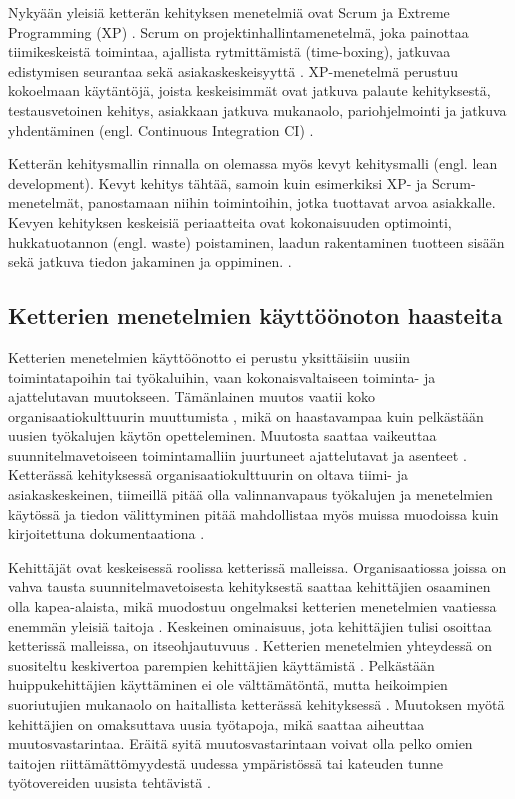 Nykyään yleisiä ketterän kehityksen menetelmiä ovat Scrum ja Extreme Programming
(XP) . Scrum on projektinhallintamenetelmä, joka painottaa
tiimikeskeistä toimintaa, ajallista rytmittämistä (time-boxing), jatkuvaa
edistymisen seurantaa sekä asiakaskeskeisyyttä .
XP-menetelmä perustuu kokoelmaan käytäntöjä, joista keskeisimmät ovat jatkuva
palaute kehityksestä, testausvetoinen kehitys, asiakkaan jatkuva mukanaolo,
pariohjelmointi ja jatkuva yhdentäminen (engl. Continuous Integration
CI) .

Ketterän kehitysmallin rinnalla on olemassa myös kevyt kehitysmalli (engl. lean
development). Kevyt kehitys tähtää, samoin kuin esimerkiksi XP- ja
Scrum-menetelmät, panostamaan niihin toimintoihin, jotka tuottavat arvoa
asiakkalle. Kevyen kehityksen keskeisiä periaatteita ovat kokonaisuuden
optimointi, hukkatuotannon (engl. waste) poistaminen, laadun rakentaminen
tuotteen sisään sekä jatkuva tiedon jakaminen ja oppiminen.
.

\subsection{Ketterien menetelmien käyttöönoton haasteita}

Ketterien menetelmien käyttöönotto ei perustu yksittäisiin uusiin
toimintatapoihin tai työkaluihin, vaan kokonaisvaltaiseen toiminta- ja
ajattelutavan muutokseen. Tämänlainen muutos vaatii koko organisaatiokulttuurin
muuttumista , mikä on haastavampaa kuin pelkästään uusien
työkalujen käytön opetteleminen. Muutosta saattaa vaikeuttaa
suunnitelmavetoiseen toimintamalliin juurtuneet ajattelutavat ja asenteet
. Ketterässä kehityksessä organisaatiokulttuurin
on oltava tiimi- ja asiakaskeskeinen, tiimeillä pitää olla valinnanvapaus
työkalujen ja menetelmien käytössä ja tiedon välittyminen pitää mahdollistaa
myös muissa muodoissa kuin kirjoitettuna dokumentaationa .

Kehittäjät ovat keskeisessä roolissa ketterissä malleissa. Organisaatiossa
joissa on vahva tausta suunnitelmavetoisesta kehityksestä saattaa kehittäjien
osaaminen olla kapea-alaista, mikä muodostuu ongelmaksi ketterien menetelmien
vaatiessa enemmän yleisiä taitoja . Keskeinen ominaisuus,
jota kehittäjien tulisi osoittaa ketterissä malleissa, on itseohjautuvuus
. Ketterien menetelmien yhteydessä on suositeltu keskivertoa
parempien kehittäjien käyttämistä . Pelkästään
huippukehittäjien käyttäminen ei ole välttämätöntä, mutta heikoimpien
suoriutujien mukanaolo on haitallista ketterässä kehityksessä
. Muutoksen myötä kehittäjien on omaksuttava uusia
työtapoja, mikä saattaa aiheuttaa muutosvastarintaa. Eräitä syitä
muutosvastarintaan voivat olla pelko omien taitojen riittämättömyydestä uudessa
ympäristössä tai kateuden tunne työtovereiden uusista tehtävistä
.


